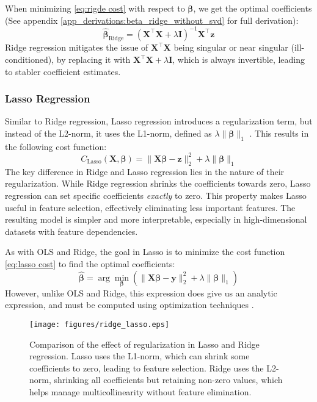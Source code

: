 \documentclass{article}
\begin{document}
\begin{multicols}{2}
When minimizing \ref{eq:rigde cost} with respect to $\bm{\beta}$, we get the optimal coefficients (See appendix \ref{app_derivations:beta_ridge_without_svd} for full derivation):
$$\bm{\hat{\beta}}_{\text{Ridge}} = (\mathbf{X}^\top \mathbf{X} + \lambda\mathbf{I})^{-1}\mathbf{X}^\top \bm{z}$$ 
Ridge regression mitigates the issue of $\mathbf{X}^\top \mathbf{X}$ being singular or near singular (ill-conditioned), by replacing it with $\mathbf{X}^\top \mathbf{X} + \lambda\mathbf{I}$, which is always invertible, leading to stabler coefficient estimates.
\cite{deisenroth_mathematics_2020}

\subsubsection*{Lasso Regression}
Similar to Ridge regression, Lasso regression  introduces a regularization term, but instead of the L2-norm, it uses the L1-norm, defined as $\lambda \| \bm{\beta} \|_{1}$ \cite{tibshirani_regression_1996}. This results in the following cost function:
\begin{equation} \label{eq:lasso cost}
    C_{\text{Lasso}}(\mathbf{X}, \bm{\beta}) = \| \mathbf{X} \bm{\beta} - \bm{z} \|_2^2 + \lambda \| \bm{\beta} \|_{1}
\end{equation}
The key difference in Ridge and Lasso regression lies in the nature of their regularization. While Ridge regression shrinks the coefficients towards zero, Lasso regression can set specific coefficients \textit{exactly} to zero. This property makes Lasso useful in feature selection, effectively eliminating less important features. The resulting model is simpler and more interpretable, especially in high-dimensional datasets with feature dependencies.

As with OLS and Ridge, the goal in Lasso is to minimize the cost function \ref{eq:lasso cost} to find the optimal coefficients:
$$\bm{\hat{\beta}} = \arg \min_{\bm{\beta}} \left( \| \mathbf{X} \bm{\beta} - \bm{y} \|_2^2 + \lambda \| \bm{\beta} \|_1 \right)$$
However, unlike OLS and Ridge, this expression does give us an analytic expression, and must be computed using optimization techniques \cite{gauraha_introduction_2018}.

\begin{figure}[H]
    \centering
    \texttt{[image: figures/ridge\_lasso.eps]}
    \caption{Comparison of the effect of regularization in Lasso and Ridge regression. Lasso uses the L1-norm, which can shrink some coefficients to zero, leading to feature selection. Ridge uses the L2-norm, shrinking all coefficients but retaining non-zero values, which helps manage multicollinearity without feature elimination.}
    \label{fig:ridge_lasso}
\end{figure}


\end{multicols}
\end{document}
